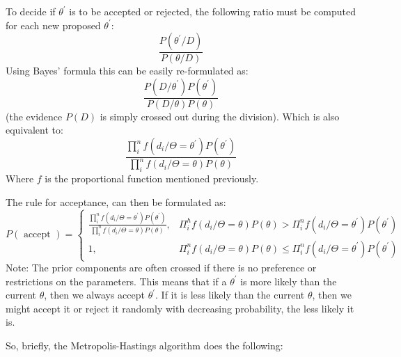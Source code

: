 To decide if $\theta^\prime$ is to be accepted or rejected, the following ratio must be computed for each new proposed $\theta^\prime$:
\begin{equation}\frac{P\left(\theta^{\prime} / D\right)}{P(\theta / D)}\end{equation}
Using Bayes' formula this can be easily re-formulated as:
\begin{equation}\frac{P\left(D / \theta^{\prime}\right) P\left(\theta^{\prime}\right)}{P(D / \theta) P(\theta)}\end{equation}
(the evidence $P(D)$ is simply crossed out during the division).
Which is also equivalent to:
\begin{equation}\frac{\prod_{i}^{n} f\left(d_{i} / \Theta=\theta^{\prime}\right) P\left(\theta^{\prime}\right)}{\prod_{i}^{n} f\left(d_{i} / \Theta=\theta\right) P(\theta)}\end{equation}
Where $f$ is the proportional function mentioned previously.

The rule for acceptance, can then be formulated as:
\begin{equation}
P(\text { accept })=\left\{
\begin{array}{ll}
\frac{\prod_{i}^{n} f\left(d_{i} / \Theta=\theta^{\prime}\right) P\left(\theta^{\prime}\right)}{\prod_{i}^{n} f\left(d_{i} / \Theta=\theta\right) P(\theta)}, & \Pi_{i}^{h} f\left(d_{i} / \Theta=\theta\right) P(\theta)>\Pi_{i}^{n} f\left(d_{i} / \Theta=\theta^{\prime}\right) P\left(\theta^{\prime}\right) \\
1,& \Pi_{i}^{n} f\left(d_{i} / \Theta=\theta\right) P(\theta) \leq \Pi_{i}^{n} f\left(d_{i} / \Theta=\theta^{\prime}\right) P\left(\theta^{\prime}\right)
\end{array}\right.
\end{equation}
Note: The prior components are often crossed if there is no preference or restrictions on the parameters.
This means that if a $\theta^\prime$ is more likely than the current $\theta$, then we always accept $\theta^\prime$. If it is less likely than the current $\theta$, then we might accept it or reject it randomly with decreasing probability, the less likely it is.

So, briefly, the Metropolis-Hastings algorithm does the following:

